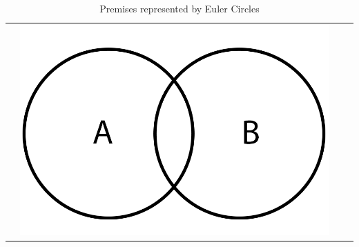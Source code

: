 \documentclass[12pt,a4paper]{report}
\begin{document}
\begin{table}[h!]
\begin{tabular}{  c  c  c  c }
\begin{minipage}{.22\textwidth}
    \end{minipage}
    &
    \begin{minipage}{.22\textwidth}
      \includegraphics[width=\textwidth]{OEuler}
    \end{minipage}
    \\
  \end{tabular}
  \caption{Premises represented by Euler Circles}\label{tbl:eulerPremises}
\end{table}
\end{document}
